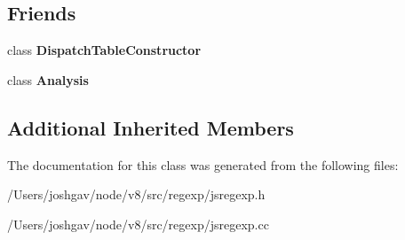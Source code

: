 \subsection*{Friends}
\begin{DoxyCompactItemize}
\item 
class {\bfseries Dispatch\+Table\+Constructor}\hypertarget{classv8_1_1internal_1_1_choice_node_ab1c57f90b7cb7e0e0c0a088d6a0f8f6c}{}\label{classv8_1_1internal_1_1_choice_node_ab1c57f90b7cb7e0e0c0a088d6a0f8f6c}

\item 
class {\bfseries Analysis}\hypertarget{classv8_1_1internal_1_1_choice_node_a1e23f70a55de946d03c863586003862d}{}\label{classv8_1_1internal_1_1_choice_node_a1e23f70a55de946d03c863586003862d}

\end{DoxyCompactItemize}
\subsection*{Additional Inherited Members}


The documentation for this class was generated from the following files\+:\begin{DoxyCompactItemize}
\item 
/\+Users/joshgav/node/v8/src/regexp/jsregexp.\+h\item 
/\+Users/joshgav/node/v8/src/regexp/jsregexp.\+cc\end{DoxyCompactItemize}
